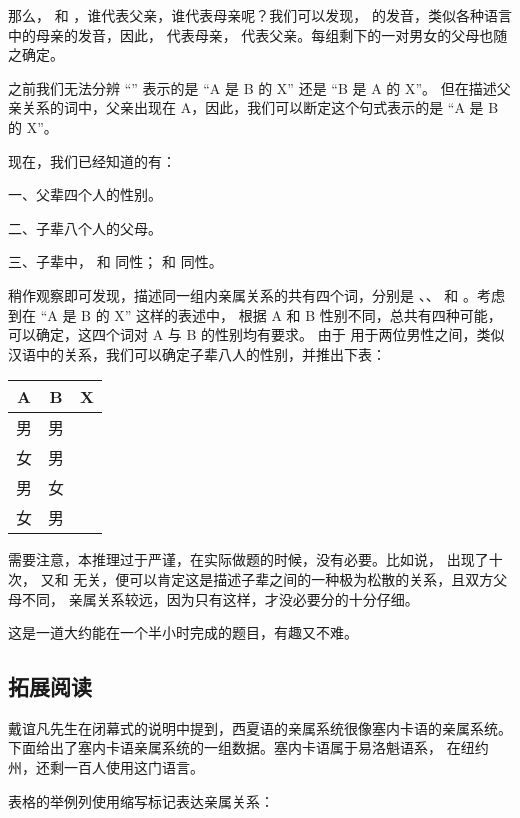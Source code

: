 那么，\word{\tangMo} 和 \word{\tangFa}，谁代表父亲，谁代表母亲呢？我们可以发现，
\word{\tangMo} 的发音，类似各种语言中的母亲的发音，因此，\word{\tangMo} 代表母亲，
\word{\tangFa} 代表父亲。每组剩下的一对男女的父母也随之确定。

之前我们无法分辨 “” 表示的是 “A 是 B 的 X” 还是 “B 是 A 的 X”。
但在描述父亲关系的词中，父亲出现在 A，因此，我们可以断定这个句式表示的是 “A 是 B 的 X”。

现在，我们已经知道的有：

一、父辈四个人的性别。

二、子辈八个人的父母。

三、子辈中，\word{\Huuyon} 和 \word{\Hooyon} 同性；\word{\Tiiyon} 和 \word{\Teeyon} 同性。

稍作观察即可发现，描述同一组内亲属关系的共有四个词，分别是 \word{\tamBr}、\word{\tamSi}、
\word{\tafBr} 和 \word{\tafSi}。考虑到在 “A 是 B 的 X” 这样的表述中，
根据 A 和 B 性别不同，总共有四种可能，可以确定，这四个词对 A 与 B 的性别均有要求。
由于 \word{\tamBr} 用于两位男性之间，类似汉语中的关系，我们可以确定子辈八人的性别，并推出下表：

\begin{tabular}{c|c|l}
\hline
A & B & X \\
\hline
男 & 男 & \word{\tamBr} \\ \hline
女 & 男 & \word{\tamSi} \\ \hline
男 & 女 & \word{\tafBr} \\ \hline
女 & 男 & \word{\tafSi} \\ \hline
\end{tabular}

需要注意，本推理过于严谨，在实际做题的时候，没有必要。比如说，\word{\txCoz} 出现了十次，
又和 \word{\Hoo} 无关，便可以肯定这是描述子辈之间的一种极为松散的关系，且双方父母不同，
亲属关系较远，因为只有这样，才没必要分的十分仔细。

这是一道大约能在一个半小时完成的题目，有趣又不难。

\subsection{拓展阅读}

戴谊凡先生在闭幕式的说明中提到，西夏语的亲属系统很像塞内卡语的亲属系统。
下面给出了塞内卡语亲属系统的一组数据\cite{Seneca}。塞内卡语属于易洛魁语系，
在纽约州，还剩一百人使用这门语言。

表格的举例列使用缩写标记表达亲属关系：

